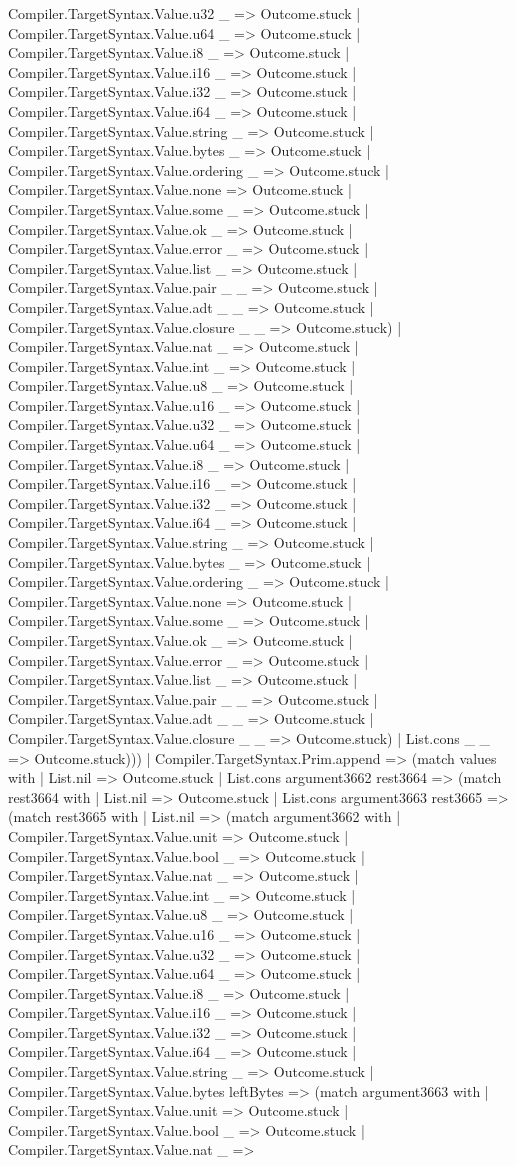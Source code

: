 \documentclass[11pt]{article}
\begin{document}
Compiler.TargetSyntax.Value.u32 \_ => Outcome.stuck | Compiler.TargetSyntax.Value.u64 \_ => Outcome.stuck | Compiler.TargetSyntax.Value.i8 \_ => Outcome.stuck | Compiler.TargetSyntax.Value.i16 \_ => Outcome.stuck | Compiler.TargetSyntax.Value.i32 \_ => Outcome.stuck | Compiler.TargetSyntax.Value.i64 \_ => Outcome.stuck | Compiler.TargetSyntax.Value.string \_ => Outcome.stuck | Compiler.TargetSyntax.Value.bytes \_ => Outcome.stuck | Compiler.TargetSyntax.Value.ordering \_ => Outcome.stuck | Compiler.TargetSyntax.Value.none => Outcome.stuck | Compiler.TargetSyntax.Value.some \_ => Outcome.stuck | Compiler.TargetSyntax.Value.ok \_ => Outcome.stuck | Compiler.TargetSyntax.Value.error \_ => Outcome.stuck | Compiler.TargetSyntax.Value.list \_ => Outcome.stuck | Compiler.TargetSyntax.Value.pair \_ \_ => Outcome.stuck | Compiler.TargetSyntax.Value.adt \_ \_ => Outcome.stuck | Compiler.TargetSyntax.Value.closure \_ \_ => Outcome.stuck) | Compiler.TargetSyntax.Value.nat \_ => Outcome.stuck | Compiler.TargetSyntax.Value.int \_ => Outcome.stuck | Compiler.TargetSyntax.Value.u8 \_ => Outcome.stuck | Compiler.TargetSyntax.Value.u16 \_ => Outcome.stuck | Compiler.TargetSyntax.Value.u32 \_ => Outcome.stuck | Compiler.TargetSyntax.Value.u64 \_ => Outcome.stuck | Compiler.TargetSyntax.Value.i8 \_ => Outcome.stuck | Compiler.TargetSyntax.Value.i16 \_ => Outcome.stuck | Compiler.TargetSyntax.Value.i32 \_ => Outcome.stuck | Compiler.TargetSyntax.Value.i64 \_ => Outcome.stuck | Compiler.TargetSyntax.Value.string \_ => Outcome.stuck | Compiler.TargetSyntax.Value.bytes \_ => Outcome.stuck | Compiler.TargetSyntax.Value.ordering \_ => Outcome.stuck | Compiler.TargetSyntax.Value.none => Outcome.stuck | Compiler.TargetSyntax.Value.some \_ => Outcome.stuck | Compiler.TargetSyntax.Value.ok \_ => Outcome.stuck | Compiler.TargetSyntax.Value.error \_ => Outcome.stuck | Compiler.TargetSyntax.Value.list \_ => Outcome.stuck | Compiler.TargetSyntax.Value.pair \_ \_ => Outcome.stuck | Compiler.TargetSyntax.Value.adt \_ \_ => Outcome.stuck | Compiler.TargetSyntax.Value.closure \_ \_ => Outcome.stuck) | List.cons \_ \_ => Outcome.stuck))) | Compiler.TargetSyntax.Prim.append => (match values with | List.nil => Outcome.stuck | List.cons argument3662 rest3664 => (match rest3664 with | List.nil => Outcome.stuck | List.cons argument3663 rest3665 => (match rest3665 with | List.nil => (match argument3662 with | Compiler.TargetSyntax.Value.unit => Outcome.stuck | Compiler.TargetSyntax.Value.bool \_ => Outcome.stuck | Compiler.TargetSyntax.Value.nat \_ => Outcome.stuck | Compiler.TargetSyntax.Value.int \_ => Outcome.stuck | Compiler.TargetSyntax.Value.u8 \_ => Outcome.stuck | Compiler.TargetSyntax.Value.u16 \_ => Outcome.stuck | Compiler.TargetSyntax.Value.u32 \_ => Outcome.stuck | Compiler.TargetSyntax.Value.u64 \_ => Outcome.stuck | Compiler.TargetSyntax.Value.i8 \_ => Outcome.stuck | Compiler.TargetSyntax.Value.i16 \_ => Outcome.stuck | Compiler.TargetSyntax.Value.i32 \_ => Outcome.stuck | Compiler.TargetSyntax.Value.i64 \_ => Outcome.stuck | Compiler.TargetSyntax.Value.string \_ => Outcome.stuck | Compiler.TargetSyntax.Value.bytes leftBytes => (match argument3663 with | Compiler.TargetSyntax.Value.unit => Outcome.stuck | Compiler.TargetSyntax.Value.bool \_ => Outcome.stuck | Compiler.TargetSyntax.Value.nat \_ => 
\end{document}
